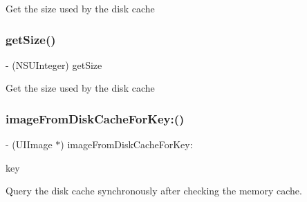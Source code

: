 Get the size used by the disk cache \mbox{\label{interface_s_d_image_cache_a934d85543e92fdb3ac35cbdff3e668d3}} 
\subsubsection{\texorpdfstring{get\+Size()}{getSize()}\hspace{0.1cm}{\footnotesize\ttfamily [3/3]}}
{\footnotesize\ttfamily -\/ (N\+S\+U\+Integer) get\+Size \begin{DoxyParamCaption}{ }\end{DoxyParamCaption}}

Get the size used by the disk cache \mbox{\label{interface_s_d_image_cache_ad3502d702952c60cd046ba4e7cba0197}} 
\subsubsection{\texorpdfstring{image\+From\+Disk\+Cache\+For\+Key\+:()}{imageFromDiskCacheForKey:()}\hspace{0.1cm}{\footnotesize\ttfamily [1/3]}}
{\footnotesize\ttfamily -\/ (U\+I\+Image $\ast$) image\+From\+Disk\+Cache\+For\+Key\+: \begin{DoxyParamCaption}\item[{(N\+S\+String $\ast$)}]{key }\end{DoxyParamCaption}}

Query the disk cache synchronously after checking the memory cache.


